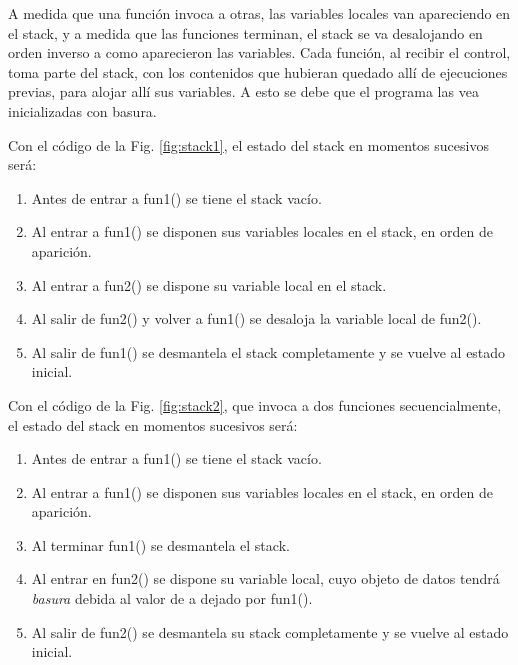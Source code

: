 A medida que una función invoca a otras, las variables locales van apareciendo en el stack, y a medida
que las funciones terminan, el stack se va desalojando en orden inverso a como aparecieron las
variables. Cada función, al recibir el control, toma parte del stack, con los contenidos que hubieran
quedado allí de ejecuciones previas, para alojar allí sus variables. A esto se debe que el programa las
vea inicializadas con basura.


\begin{ejemplo}
Con el código de la Fig. \ref{fig:stack1}, el estado del stack en momentos sucesivos será: 
\begin{enumerate}
\item Antes de entrar a fun1() se tiene el stack vacío.
\item Al entrar a fun1() se disponen sus variables locales en el stack, en orden de aparición.
\item Al entrar a fun2() se dispone su variable local en el stack.
\item Al salir de fun2() y volver a fun1() se desaloja la variable local de fun2().
\item Al salir de fun1() se desmantela el stack completamente y se vuelve al estado inicial.
\end{enumerate}
\end{ejemplo}

\begin{ejemplo}
Con el código de la Fig. \ref{fig:stack2}, que invoca a dos funciones secuencialmente, el estado del stack en momentos sucesivos será: 
\begin{enumerate}
\item Antes de entrar a fun1() se tiene el stack vacío.
\item Al entrar a fun1() se disponen sus variables locales en el stack, en orden de aparición.
\item Al terminar fun1() se desmantela el stack.
\item Al entrar en fun2() se dispone su variable local, cuyo objeto de datos tendrá \textit{basura} debida al valor de a dejado por fun1().
\item Al salir de fun2() se desmantela su stack completamente y se vuelve al estado inicial.
\end{enumerate}
\end{ejemplo}

